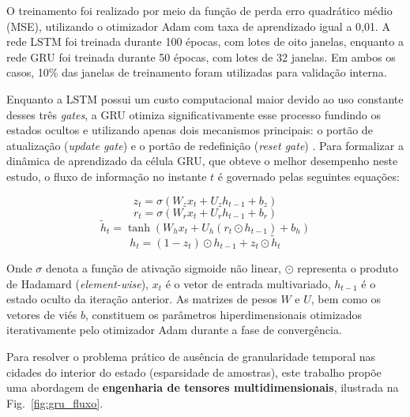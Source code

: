 \documentclass[10pt,conference]{IEEEtran}
\begin{document}
O treinamento foi realizado por meio da função de perda erro quadrático médio (MSE), utilizando o otimizador Adam com taxa de aprendizado igual a 0,01. A rede LSTM foi treinada durante 100 épocas, com lotes de oito janelas, enquanto a rede GRU foi treinada durante 50 épocas, com lotes de 32 janelas. Em ambos os casos, 10\% das janelas de treinamento foram utilizadas para validação interna.

Enquanto a LSTM possui um custo computacional maior devido ao uso constante desses três \textit{gates}, a GRU otimiza significativamente esse processo fundindo os estados ocultos e utilizando apenas dois mecanismos principais: o portão de atualização (\textit{update gate}) e o portão de redefinição (\textit{reset gate}) \cite{cho2014learning}. Para formalizar a dinâmica de aprendizado da célula GRU, que obteve o melhor desempenho neste estudo, o fluxo de informação no instante $t$ é governado pelas seguintes equações:

$$z_t = \sigma(W_z x_t + U_z h_{t-1} + b_z)$$
$$r_t = \sigma(W_r x_t + U_r h_{t-1} + b_r)$$
$$\tilde{h}_t = \tanh(W_h x_t + U_h (r_t \odot h_{t-1}) + b_h)$$
$$h_t = (1 - z_t) \odot h_{t-1} + z_t \odot \tilde{h}_t$$

Onde $\sigma$ denota a função de ativação sigmoide não linear, $\odot$ representa o produto de Hadamard (\textit{element-wise}), $x_t$ é o vetor de entrada multivariado, $h_{t-1}$ é o estado oculto da iteração anterior. As matrizes de pesos $W$ e $U$, bem como os vetores de viés $b$, constituem os parâmetros hiperdimensionais otimizados iterativamente pelo otimizador Adam durante a fase de convergência.

Para resolver o problema prático de ausência de granularidade temporal nas cidades do interior do estado (esparsidade de amostras), este trabalho propõe uma abordagem de \textbf{engenharia de tensores multidimensionais}, ilustrada na Fig.~\ref{fig:gru_fluxo}.
\end{document}
